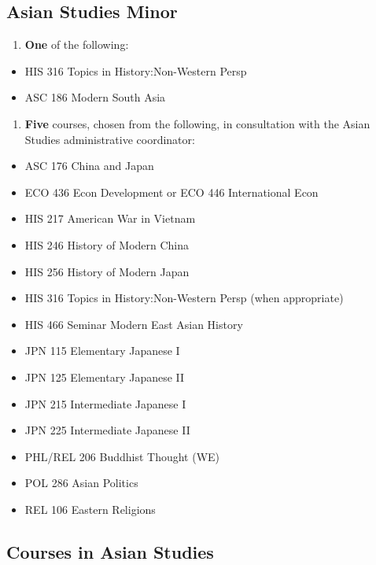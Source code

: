 \documentclass[
  letterpaper,
]{scrbook}
\providecommand{\tightlist}{%
  \setlength{\itemsep}{0pt}\setlength{\parskip}{0pt}}
\begin{document}
\subsection{Asian Studies Minor}\label{asian-studies-minor}

\begin{enumerate}
\def\labelenumi{\arabic{enumi}.}
\tightlist
\item
  \textbf{One} of the following:
\end{enumerate}

\begin{itemize}
\tightlist
\item
  HIS 316 Topics in History:Non-Western Persp
\item
  ASC 186 Modern South Asia
\end{itemize}

\begin{enumerate}
\def\labelenumi{\arabic{enumi}.}
\setcounter{enumi}{1}
\tightlist
\item
  \textbf{Five} courses, chosen from the following, in consultation with
  the Asian Studies administrative coordinator:
\end{enumerate}

\begin{itemize}
\tightlist
\item
  ASC 176 China and Japan
\item
  ECO 436 Econ Development or ECO 446 International Econ
\item
  HIS 217 American War in Vietnam
\item
  HIS 246 History of Modern China
\item
  HIS 256 History of Modern Japan
\item
  HIS 316 Topics in History:Non-Western Persp (when appropriate)
\item
  HIS 466 Seminar Modern East Asian History
\item
  JPN 115 Elementary Japanese I
\item
  JPN 125 Elementary Japanese II
\item
  JPN 215 Intermediate Japanese I
\item
  JPN 225 Intermediate Japanese II
\item
  PHL/REL 206 Buddhist Thought (WE)
\item
  POL 286 Asian Politics
\item
  REL 106 Eastern Religions
\end{itemize}

\subsection{Courses in Asian Studies}\label{courses-in-asian-studies}
\end{document}
